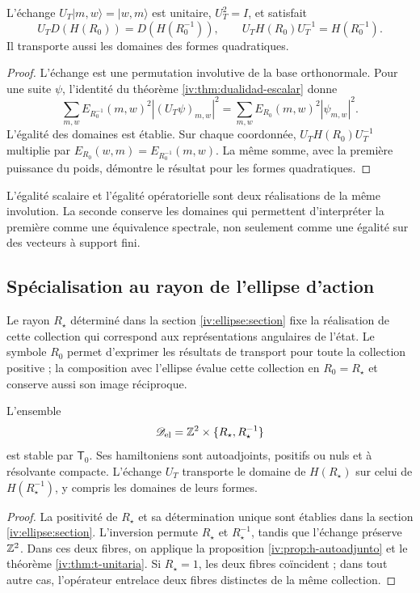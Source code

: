 \begin{theorem}
\label{iv:thm:t-unitaria}
\label{prop:dualidad-radios-k}
L’échange
\(U_T|m,w\rangle=|w,m\rangle\) est unitaire,
\(U_T^2=I\), et satisfait
\begin{equation}
 U_TD(H(R_0))=D(H(R_0^{-1})),
 \qquad U_TH(R_0)U_T^{-1}=H(R_0^{-1}).
 \label{iv:eq:conjugacion-h}
\end{equation}
Il transporte aussi les domaines des formes quadratiques.
\end{theorem}
\begin{proof}
L’échange est une permutation involutive de la base
orthonormale. Pour une suite \(\psi\), l’identité du
théorème \ref{iv:thm:dualidad-escalar} donne
\[
 \sum_{m,w}E_{R_0^{-1}}(m,w)^2|(U_T\psi)_{m,w}|^2
 =\sum_{m,w}E_{R_0}(m,w)^2|\psi_{m,w}|^2.
\]
L’égalité des domaines est établie. Sur chaque coordonnée,
\(U_TH(R_0)U_T^{-1}\) multiplie par
\(E_{R_0}(w,m)=E_{R_0^{-1}}(m,w)\). La même somme, avec
la première puissance du poids, démontre le résultat pour les
formes quadratiques.

\end{proof}

L’égalité scalaire et l’égalité opératorielle sont deux réalisations
de la même involution. La seconde conserve les domaines qui
permettent d’interpréter la première comme une équivalence spectrale,
non seulement comme une égalité sur des vecteurs à support fini.

\subsection{Spécialisation au rayon de l’ellipse d’action}

Le rayon \(R_\star\) déterminé dans la section
\ref{iv:ellipse:section} fixe la réalisation de cette collection qui
correspond aux représentations angulaires de l’état. Le symbole
\(R_0\) permet d’exprimer les résultats de transport pour toute la
collection positive ; la composition avec l’ellipse évalue cette collection en
\(R_0=R_\star\) et conserve aussi son image réciproque.

\begin{corollary}
\label{iv:cor:radio-especializado}
L'ensemble
\[
 \mathscr D_{\mathrm{el}}
 =\mathbb Z^2\times\{R_\star,R_\star^{-1}\}
\]
est stable par \(\mathsf T_0\). Ses hamiltoniens sont autoadjoints,
positifs ou nuls et à résolvante compacte. L’échange \(U_T\)
transporte le domaine de \(H(R_\star)\) sur celui de
\(H(R_\star^{-1})\), y compris les domaines de leurs formes.

\end{corollary}
\begin{proof}
La positivité de \(R_\star\) et sa détermination unique sont établies
dans la section \ref{iv:ellipse:section}. L’inversion permute
\(R_\star\) et \(R_\star^{-1}\), tandis que l’échange préserve
\(\mathbb Z^2\). Dans ces deux fibres, on applique la proposition
\ref{iv:prop:h-autoadjunto} et le théorème \ref{iv:thm:t-unitaria}.
Si \(R_\star=1\), les deux fibres coïncident ; dans tout autre cas,
l’opérateur entrelace deux fibres distinctes de la même collection.
\end{proof}

